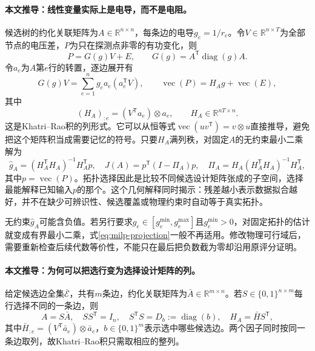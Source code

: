 \paragraph{本文推导：线性变量实际上是电导，而不是电阻。}
候选树的约化关联矩阵为$A\in\mathbb R^{n\times n}$，每条边的电导$g_e=1/r_e$。令$V\in\mathbb R^{n\times T}$为全部节点的电压差，$P$为只在探测点非零的有功变化，则
\begin{equation}
 P=G(g)V+E,\qquad G(g)=A^{\mathsf T}\operatorname{diag}(g)A.
 \label{eq:milp-probe-model}
\end{equation}
令$a_e$为$A$第$e$行的转置，逐边展开有
\begin{equation}
 G(g)V=\sum_{e=1}^{n}g_ea_e(a_e^{\mathsf T}V),\qquad
 \operatorname{vec}(P)=H_Ag+\operatorname{vec}(E),
 \label{eq:milp-vectorize}
\end{equation}
其中
\begin{equation}
 (H_A)_{:e}=(V^{\mathsf T}a_e)\otimes a_e,
 \qquad H_A\in\mathbb R^{nT\times n}.
 \label{eq:milp-design}
\end{equation}
这是Khatri--Rao积的列形式。它可以从恒等式$\operatorname{vec}(uv^{\mathsf T})=v\otimes u$直接推导，避免把这个矩阵积当成需要记忆的符号。只要$H_A$满列秩，对固定$A$的无约束最小二乘解为
\begin{equation}
 \widehat g_A=(H_A^{\mathsf T}H_A)^{-1}H_A^{\mathsf T}p,
 \quad
 J(A)=p^{\mathsf T}(I-\Pi_A)p,
 \quad
 \Pi_A=H_A(H_A^{\mathsf T}H_A)^{-1}H_A^{\mathsf T},
 \label{eq:milp-projection}
\end{equation}
其中$p=\operatorname{vec}(P)$。拓扑选择因此是比较不同候选设计矩阵张成的子空间，选择最能解释已知输入$p$的那个。这个几何解释同时揭示：残差越小表示数据拟合越好，并不在缺少可辨识性、候选覆盖或物理约束时自动等于真实拓扑。

无约束$\widehat g_A$可能含负值。若另行要求$g_e\in[g_e^{\min},g_e^{\max}]$且$g_e^{\min}>0$，对固定拓扑的估计就变成有界最小二乘，式\eqref{eq:milp-projection}一般不再适用。修改物理可行域后，需要重新检查后续代数等价性，不能只在最后把负数截为零却沿用原评分证明。

\paragraph{本文推导：为何可以把选行变为选择设计矩阵的列。}
给定候选边全集$\overline{\mathcal E}$，共有$m$条边，约化关联矩阵为$\bar A\in\mathbb R^{m\times n}$。若$S\in\{0,1\}^{n\times m}$每行选择不同的一条边，则
\begin{equation}
 A=S\bar A,\quad SS^{\mathsf T}=I_n,\quad
 S^{\mathsf T}S=D_b:=\operatorname{diag}(b),\quad
 H_A=\bar H S^{\mathsf T},
 \label{eq:milp-selector}
\end{equation}
其中$\bar H_{:e}=(V^{\mathsf T}\bar a_e)\otimes\bar a_e$，$b\in\{0,1\}^m$表示选中哪些候选边。两个因子同时按同一条边取列，故Khatri--Rao积只需取相应的整列。

